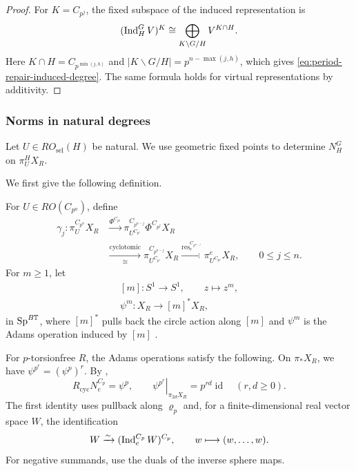 \begin{proof}
For $K=C_{p^j}$, the fixed subspace of the induced representation is
\[
(\operatorname{Ind}_H^G V)^K\cong
\bigoplus_{K\backslash G/H}V^{K\cap H}.
\]
Here $K\cap H=C_{p^{\min(j,h)}}$ and
$|K\backslash G/H|=p^{n-\max(j,h)}$, which gives
\eqref{eq:period-repair-induced-degree}. The same formula holds
for virtual representations by additivity.
\end{proof}

\subsubsection{Norms in natural degrees}
Let $U\in RO_{\mathrm{sel}}(H)$ be natural.
We use geometric fixed points to determine $N_H^G$ on $\pi_U^H X_R$.

We first give the following definition.

\begin{definition}\label{def:geometric-fixed-point-maps}
For $U\in RO(C_{p^n})$, define
\[
\begin{aligned}
\gamma_j\colon
\pi_U^{C_{p^n}}X_R
&\xrightarrow{\Phi^{C_{p^j}}}
\pi_{U^{C_{p^j}}}^{C_{p^{n-j}}}
\Phi^{C_{p^j}}X_R\\
&\xrightarrow[\cong]{\mathrm{cyclotomic}}
\pi_{U^{C_{p^j}}}^{C_{p^{n-j}}}X_R
\xrightarrow{\operatorname{res}_e^{C_{p^{n-j}}}}
\pi_{U^{C_{p^j}}}^{e}X_R,
\qquad 0\le j\le n.
\end{aligned}
\]
For \(m\ge 1\), let
\[
\begin{gathered}
[m]\colon S^1\longrightarrow S^1,
\qquad z\longmapsto z^m,\\
\psi^m\colon X_R\longrightarrow [m]^*X_R,
\end{gathered}
\]
in $\operatorname{Sp}^{B\mathbb T}$, where $[m]^*$ pulls back the circle action along $[m]$ and
$\psi^m$ is the Adams operation induced by $[m]$
\cite[Definition~5.1 and Remark~5.2]{SulymaNew}.
\end{definition}

For $p$-torsionfree $R$, the Adams operations satisfy the following.
On $\pi_*X_R$, we have $\psi^{p^r}=(\psi^p)^r$.
By \cite[Remark~5.2 and Lemma~5.3]{SulymaNew},
\begin{equation}\label{eq:rcyc-crossing}
R_{\mathrm{cyc}}N_e^{C_p}=\psi^p,
\qquad
\left.\psi^{p^r}\right|_{\pi_{2d}X_R}
=p^{rd}\operatorname{id}
\quad(r,d\ge0).
\end{equation}
The first identity uses pullback along $\varrho_p$ and,
for a finite-dimensional real vector space $W$, the identification
\[
W\xrightarrow{\sim}(\operatorname{Ind}_e^{C_p}W)^{C_p},
\qquad w\longmapsto(w,\ldots,w).
\]
For negative summands, use the duals of the inverse sphere maps.

